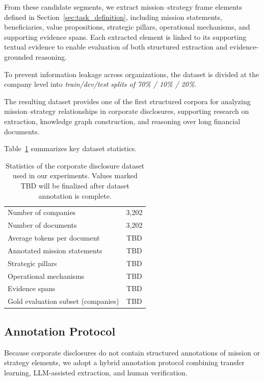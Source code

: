 \documentclass[11pt]{article}
\begin{document}
From these candidate segments, we extract mission--strategy frame elements defined in Section~\ref{sec:task_definition}, including mission statements, beneficiaries, value propositions, strategic pillars, operational mechanisms, and supporting evidence spans. Each extracted element is linked to its supporting textual evidence to enable evaluation of both structured extraction and evidence-grounded reasoning.

To prevent information leakage across organizations, the dataset is divided at the company level into \textit{train/dev/test splits of 70\% / 10\% / 20\%}.

The resulting dataset provides one of the first structured corpora for analyzing mission--strategy relationships in corporate disclosures, supporting research on extraction, knowledge graph construction, and reasoning over long financial documents.

Table~\ref{tab:dataset_stats} summarizes key dataset statistics.

\begin{table}[h]
\centering
\caption{Statistics of the corporate disclosure dataset used in our experiments. Values marked TBD will be finalized after dataset annotation is complete.}
\label{tab:dataset_stats}
\begin{tabular}{lc}
\hline
Number of companies & 3,202 \\
Number of documents & 3,202 \\
Average tokens per document & TBD \\
Annotated mission statements & TBD \\
Strategic pillars & TBD \\
Operational mechanisms & TBD \\
Evidence spans & TBD \\
Gold evaluation subset (companies) & TBD \\
\hline
\end{tabular}
\end{table}


\subsection{Annotation Protocol}
\label{sec:annotation_protocol}

Because corporate disclosures do not contain structured annotations of mission or strategy elements, we adopt a hybrid annotation protocol combining transfer learning, LLM-assisted extraction, and human verification.
\end{document}
